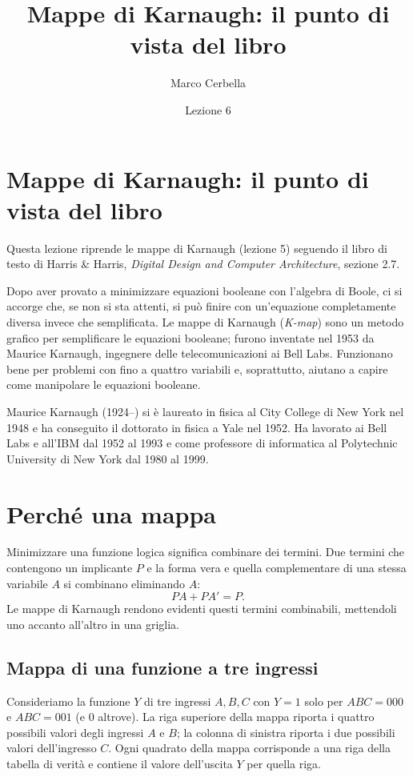 \documentclass[11pt,a4paper]{article}
\title{Mappe di Karnaugh: il punto di vista del libro}
\author{Marco Cerbella}
\date{Lezione 6}
\begin{document}
\maketitle

\section{Mappe di Karnaugh: il punto di vista del libro}

Questa lezione riprende le mappe di Karnaugh (lezione 5) seguendo il libro di testo di Harris \& Harris, \emph{Digital Design and Computer Architecture}, sezione 2.7.

Dopo aver provato a minimizzare equazioni booleane con l'algebra di Boole, ci si accorge che, se non si sta attenti, si può finire con un'equazione completamente diversa invece che semplificata. Le mappe di Karnaugh (\emph{K-map}) sono un metodo grafico per semplificare le equazioni booleane; furono inventate nel 1953 da Maurice Karnaugh, ingegnere delle telecomunicazioni ai Bell Labs. Funzionano bene per problemi con fino a quattro variabili e, soprattutto, aiutano a capire come manipolare le equazioni booleane.

\begin{osservazione}
Maurice Karnaugh (1924--) si è laureato in fisica al City College di New York nel 1948 e ha conseguito il dottorato in fisica a Yale nel 1952. Ha lavorato ai Bell Labs e all'IBM dal 1952 al 1993 e come professore di informatica al Polytechnic University di New York dal 1980 al 1999.
\end{osservazione}

\section{Perché una mappa}

Minimizzare una funzione logica significa combinare dei termini. Due termini che contengono un implicante $P$ e la forma vera e quella complementare di una stessa variabile $A$ si combinano eliminando $A$:
\[
PA + PA' = P.
\]
Le mappe di Karnaugh rendono evidenti questi termini combinabili, mettendoli uno accanto all'altro in una griglia.

\subsection{Mappa di una funzione a tre ingressi}

Consideriamo la funzione $Y$ di tre ingressi $A, B, C$ con $Y = 1$ solo per $ABC = 000$ e $ABC = 001$ (e $0$ altrove). La riga superiore della mappa riporta i quattro possibili valori degli ingressi $A$ e $B$; la colonna di sinistra riporta i due possibili valori dell'ingresso $C$. Ogni quadrato della mappa corrisponde a una riga della tabella di verità e contiene il valore dell'uscita $Y$ per quella riga.
\end{document}
